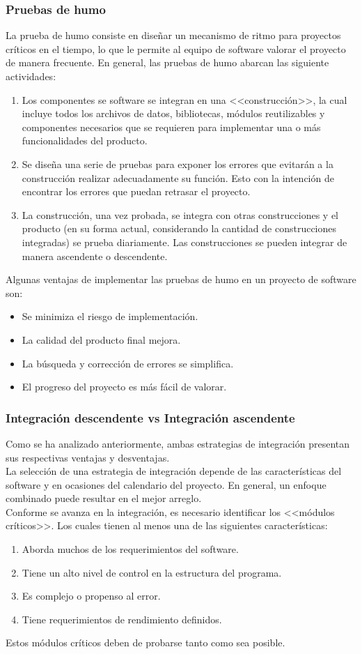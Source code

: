 \subsubsection{Pruebas de humo}
La prueba de humo consiste en diseñar un mecanismo de ritmo para proyectos críticos en el tiempo, lo que le permite al equipo de software valorar el proyecto de manera frecuente. En general, las pruebas de humo abarcan las siguiente actividades:
\begin{enumerate}
	\item Los componentes se software se integran en una <<construcción>>, la cual incluye todos los archivos de datos, bibliotecas, módulos reutilizables y componentes necesarios que se requieren para implementar una o más funcionalidades del producto.
	\item Se diseña una serie de pruebas para exponer los errores que evitarán a la construcción realizar adecuadamente su función. Esto con la intención de encontrar los errores que puedan retrasar el proyecto.
	\item La construcción, una vez probada, se integra con otras construcciones y el producto (en su forma actual, considerando la cantidad de construcciones integradas) se prueba diariamente. Las construcciones se pueden integrar de manera ascendente o descendente.
\end{enumerate}
Algunas ventajas de implementar las pruebas de humo en un proyecto de software son:
\begin{itemize}
	\item Se minimiza el riesgo de implementación.
	\item La calidad del producto final mejora.
	\item La búsqueda y corrección de errores se simplifica.
	\item El progreso del proyecto es más fácil de valorar.
\end{itemize}
\subsubsection{Integración descendente vs Integración ascendente}
Como se ha analizado anteriormente, ambas estrategias de integración presentan sus respectivas ventajas y desventajas.\\
La selección de una estrategia de integración depende de las características del software y en ocasiones del calendario del proyecto. En general, un enfoque combinado puede resultar en el mejor arreglo.\\ Conforme se avanza en la integración, es necesario identificar los <<módulos críticos>>. Los cuales tienen al menos una de las siguientes características:
\begin{enumerate}
	\item Aborda muchos de los requerimientos del software.
	\item Tiene un alto nivel de control en la estructura del programa.
	\item Es complejo o propenso al error.
	\item Tiene requerimientos de rendimiento definidos.
\end{enumerate}
Estos módulos críticos deben de probarse tanto como sea posible.
